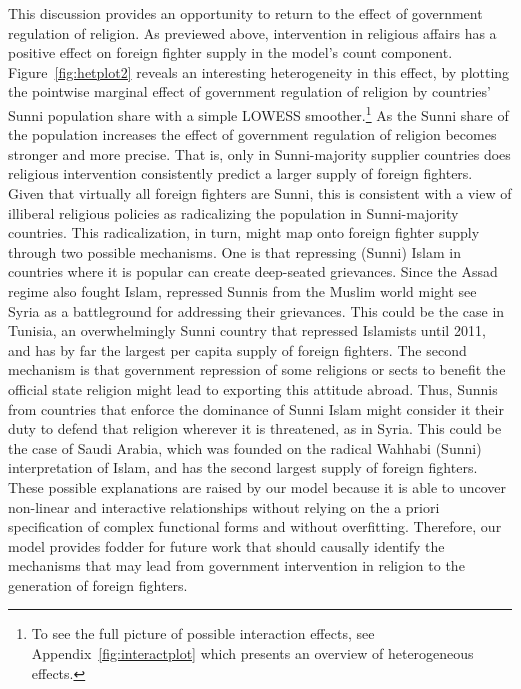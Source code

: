 \documentclass[12pt]{article}
\begin{document}
This discussion provides an opportunity to return to the effect of government regulation of religion. As previewed above, intervention in religious affairs has a positive effect on foreign fighter supply in the model's count component. Figure~\ref{fig:hetplot2} reveals an interesting heterogeneity in this effect, by plotting the pointwise marginal effect of government regulation of religion by countries' Sunni population share with a simple LOWESS smoother.\footnote{To see the full picture of possible interaction effects, see Appendix~\ref{fig:interactplot} which presents an overview of heterogeneous effects.} As the Sunni share of the population increases the effect of government regulation of religion becomes stronger and more precise. That is, only in Sunni-majority supplier countries does religious intervention consistently predict a larger supply of foreign fighters. Given that virtually all foreign fighters are Sunni, this is consistent with a view of illiberal religious policies as radicalizing the population in Sunni-majority countries. This radicalization, in turn, might map onto foreign fighter supply through two possible mechanisms. One is that repressing (Sunni) Islam in countries where it is popular can create deep-seated grievances. Since the Assad regime also fought Islam, repressed Sunnis from the Muslim world might see Syria as a battleground for addressing their grievances. This could be the case in Tunisia, an overwhelmingly Sunni country that repressed Islamists until 2011, and has by far the largest per capita supply of foreign fighters. The second mechanism is that government repression of some religions or sects to benefit the official state religion might lead to exporting this attitude abroad. Thus, Sunnis from countries that enforce the dominance of Sunni Islam might consider it their duty to defend that religion wherever it is threatened, as in Syria. This could be the case of Saudi Arabia, which was founded on the radical Wahhabi (Sunni) interpretation of Islam, and has the second largest supply of foreign fighters.	\\

These possible explanations are raised by our model because it is able to uncover non-linear and interactive relationships without relying on the a priori specification of complex functional forms and without overfitting. Therefore, our model provides fodder for future work that should causally identify the mechanisms that may lead from government intervention in religion to the generation of foreign fighters.	 \\
\end{document}
